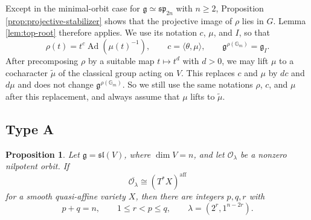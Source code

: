 \documentclass[12pt]{article}
\newtheorem{proposition}[theorem]{Proposition}
\theoremstyle{remark}
\theoremstyle{plain}
\DeclareMathOperator{\Ad}{Ad}
\newcommand{\Gm}{\mathbb G_m}
\newcommand{\aff}{\mathrm{aff}}
\begin{document}
Except in the minimal-orbit case for
$\mathfrak g\simeq\mathfrak{sp}_{2n}$ with $n\geq2$, Proposition
\ref{prop:projective-stabilizer} shows that the projective image of
$\rho$ lies in $G$. Lemma \ref{lem:top-root} therefore applies.
We use its notation $c$, $\mu$, and $I$, so that
\begin{equation}\label{eq:rho-classical}
\rho(t)=t^c\Ad(\mu(t)^{-1}),
\qquad
c=\langle\theta,\mu\rangle,
\qquad
\mathfrak g^{\rho(\Gm)}=\mathfrak g_I.
\end{equation}
After precomposing $\rho$ by a suitable map $t\mapsto t^d$ with $d>0$, we may
lift $\mu$ to a cocharacter $\widetilde{\mu}$ of the classical group
acting on $V$. This replaces $c$ and $\mu$ by $dc$ and $d\mu$ and does
not change $\mathfrak g^{\rho(\Gm)}$. So we still use the same
notations $\rho$, $c$, and $\mu$ after this replacement, and always
assume that $\mu$ lifts to $\widetilde{\mu}$.

\subsection{Type A}\label{sec:typeA}

\begin{proposition}\label{prop:typeA}
Let $\mathfrak g=\mathfrak{sl}(V)$, where $\dim V=n$, and let
$\mathcal O_\lambda$ be a nonzero nilpotent orbit. If
\[
\overline{\mathcal O_\lambda}\cong(T^*X)^{\aff}
\]
for a smooth quasi-affine variety $X$, then
there are integers $p,q,r$ with
\[
p+q=n,
\qquad
1\leq r<p\leq q,
\qquad
\lambda=(2^r,1^{n-2r}).
\]
\end{proposition}
\end{document}
